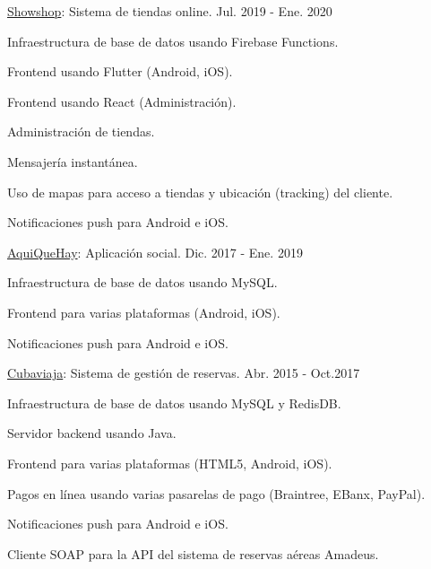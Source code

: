 \begin{cventries}
  \cventry
    {\href{https://showshop.app/}{Showshop}: Sistema de tiendas online.} %
    {} %
    {} %
    {Jul. 2019 - Ene. 2020} %
    {
      \begin{cvitems} %
        \item {Infraestructura de base de datos usando Firebase Functions.}
        \item {Frontend usando Flutter (Android, iOS).}
        \item {Frontend usando React (Administración).}
        \item {Administración de tiendas.}
        \item {Mensajería instantánea.}
        \item {Uso de mapas para acceso a tiendas y ubicación (tracking) del cliente.}
        \item {Notificaciones push para Android e iOS.}
      \end{cvitems}
    }

  \cventry
    {\href{https://aquiquehay.com.ec/}{AquiQueHay}: Aplicación social.} %
    {} %
    {} %
    {Dic. 2017 - Ene. 2019} %
    {
      \begin{cvitems} %
        \item {Infraestructura de base de datos usando MySQL.}
        \item {Frontend para varias plataformas (Android, iOS).}
        \item {Notificaciones push para Android e iOS.}
      \end{cvitems}
    }

  \cventry
    {\href{https://www.cuballama.com/viajes/vuelos}{Cubaviaja}: Sistema de gestión de reservas.} %
    {} %
    {} %
    {Abr. 2015 - Oct.2017} %
    {
      \begin{cvitems} %
        \item {Infraestructura de base de datos usando MySQL y RedisDB.}
        \item {Servidor backend usando Java.}
        \item {Frontend para varias plataformas (HTML5, Android, iOS).}
        \item {Pagos en línea usando varias pasarelas de pago (Braintree, EBanx, PayPal).}
        \item {Notificaciones push para Android e iOS.}
        \item {Cliente SOAP para la API del sistema de reservas aéreas Amadeus.}
      \end{cvitems}
    }


\end{cventries}
